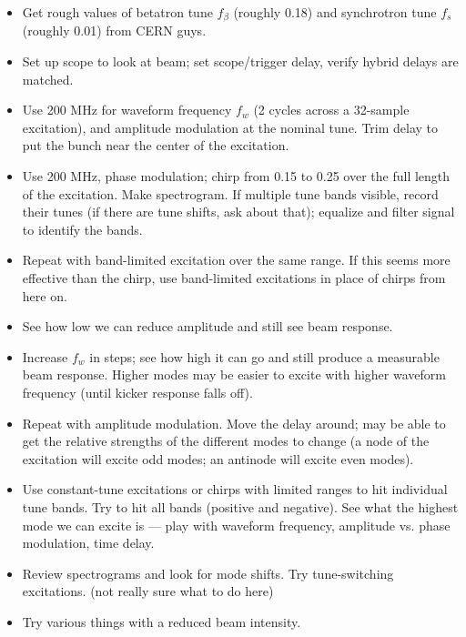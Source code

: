 \documentclass{article}
\begin{document}
\begin{itemize}
	\item Get rough values of betatron tune $f_\beta$ (roughly 0.18) and synchrotron tune $f_s$ (roughly 0.01) from CERN guys.

	\item Set up scope to look at beam; set scope/trigger delay, verify hybrid delays are matched.

	\item Use 200 MHz for waveform frequency $f_w$ (2 cycles across a 32-sample excitation), and amplitude modulation at the nominal tune. Trim delay to put the bunch near the center of the excitation.

	\item Use 200 MHz, phase modulation; chirp from 0.15 to 0.25 over the full length of the excitation. Make spectrogram. If multiple tune bands visible, record their tunes (if there are tune shifts, ask about that); equalize and filter signal to identify the bands.

	\item Repeat with band-limited excitation over the same range. If this seems more effective than the chirp, use band-limited excitations in place of chirps from here on.

	\item See how low we can reduce amplitude and still see beam response.

	\item Increase $f_w$ in steps; see how high it can go and still produce a measurable beam response. Higher modes may be easier to excite with higher waveform frequency (until kicker response falls off).

	\item Repeat with amplitude modulation. Move the delay around; may be able to get the relative strengths of the different modes to change (a node of the excitation will excite odd modes; an antinode will excite even modes).

	\item Use constant-tune excitations or chirps with limited ranges to hit individual tune bands. Try to hit all bands (positive and negative). See what the highest mode we can excite is --- play with waveform frequency, amplitude vs. phase modulation, time delay.

	\item Review spectrograms and look for mode shifts. Try tune-switching excitations. (not really sure what to do here)

	\item Try various things with a reduced beam intensity.
\end{itemize}
\end{document}
